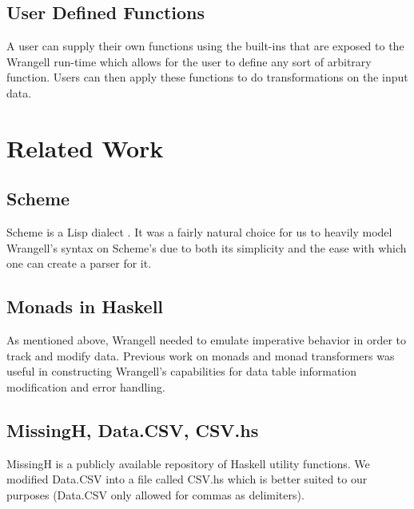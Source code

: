 \documentclass[preprint,nocopyrightspace]{sig-alternate}
\begin{document}
\subsection{User Defined Functions}
A user can supply their own functions using the built-ins that are exposed to the Wrangell run-time which allows for the user to define any sort of arbitrary function. Users can then apply these functions to do transformations on the input data.
\begin{comment}
TODO: Show an example Wrangell function definition
\end{comment}

\begin{comment}
\subsection{Other Functionality of Wrangell}
.............()....more discussion of what Wrangell can do?...........()...................
\end{comment}

\section{Related Work}

\subsection{Scheme}
Scheme is a Lisp dialect \cite{scheme}. It was a fairly natural choice for us to heavily model Wrangell's syntax on Scheme's due to both its simplicity and the ease with which one can create a parser for it.

\subsection{Monads in Haskell}
As mentioned above, Wrangell needed to emulate imperative behavior in order to track and modify data. Previous work on monads and monad transformers \citep{monadTransform} was useful in constructing Wrangell's capabilities for data table information modification and error handling. 

\subsection{MissingH, Data.CSV, CSV.hs}
MissingH \cite{dataCSV} is a publicly available repository of Haskell utility functions. We modified Data.CSV into a file called CSV.hs which is better suited to our purposes (Data.CSV only allowed for commas as delimiters).
\end{document}
